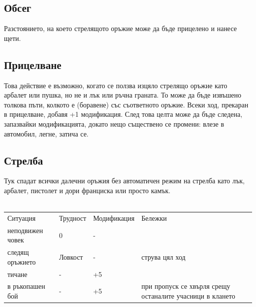 





\subsection{Обсег}
Разстоянието, на което стрелящото оръжие може да бъде прицелено и нанесе щети.


\subsection{Прицелване}
Това действие е възможно, когато се ползва изцяло стрелящо оръжие като арбалет или пушка, но не и лък или ръчна граната.
То може да бъде извъшено толкова пъти, колкото е (боравене) със съответното оръжие.
Всеки ход, прекаран в прицелване, добавя +1 модификация.
След това целта може да бъде следена, запазвайки модификацията, докато нещо съществено се промени: влезе в автомобил, легне, затича се.


\subsection{Стрелба}
Тук спадат всички далечни оръжия без автоматичен режим на стрелба като лък, арбалет, пистолет и дори франциска или просто камък.
\\
\\
\begin{tabular}{l | l | l | l }
Ситуация         & Трудност & Модификация & Бележки                                                    \\
неподвижен човек & 0        & -           &                                                            \\
следящ оръжието  & Ловкост  & -           & струва цял ход                                             \\
тичане           & -        & +5          &                                                            \\
в ръкопашен бой  & -        & +5          & при пропуск се хвърля срещу останалите учасници в клането  \\
\end{tabular}
\\



